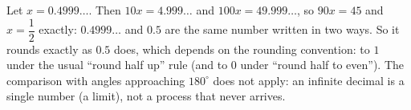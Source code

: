 Let $x=0.4999\ldots$. Then $10x=4.999\ldots$ and $100x=49.999\ldots$, so $90x=45$ and $x=\dfrac{1}{2}$ exactly: $0.4999\ldots$ and $0.5$ are the same number written in two ways. So it rounds exactly as $0.5$ does, which depends on the rounding convention: to $\boxed{1}$ under the usual ``round half up'' rule (and to $0$ under ``round half to even''). The comparison with angles approaching $180^\circ$ does not apply: an infinite decimal is a single number (a limit), not a process that never arrives.
